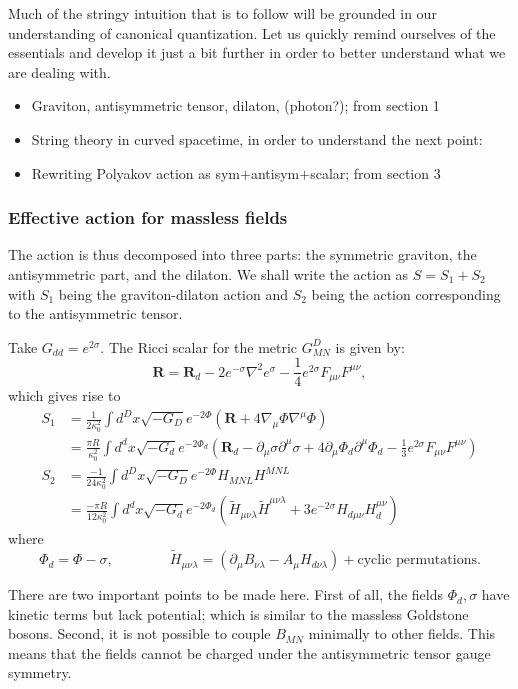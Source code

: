 \documentclass{report}
\theoremstyle{plain}
\theoremstyle{definition}
\theoremstyle{remark}
\newcommand{\FR}[2]{\frac{#1}{#2}}
\newcommand{\lam}{\lambda}
\newcommand{\sg}{\sigma}
\newcommand{\di}{\partial}
\newcommand{\colf}[1]{ {\color{Fuchsia} #1 } }
\begin{document}
Much of the stringy intuition that is to follow will be grounded in our
understanding of canonical quantization. Let us quickly remind ourselves of
the essentials and develop it just a bit further in order to better
understand what we are dealing with.

\begin{itemize}
\item Graviton, antisymmetric tensor, dilaton, (photon?); from section 1
\item String theory in curved spacetime, in order to understand the next
    point:
\item Rewriting Polyakov action as sym$+$antisym$+$scalar; from section 3
\end{itemize}

\begin{mdframed}
\subsubsection{Effective action for massless fields}
The action is thus decomposed into three parts: the symmetric graviton, the
antisymmetric part, and the dilaton. We shall write the action as $S =
S_1+S_2$ with $S_1$ being the graviton-dilaton action and $S_2$ being the
action corresponding to the antisymmetric tensor.

Take $G_{dd}=e^{2\sg}$. The Ricci scalar for the metric $G^D_{MN}$ is given
by: \[ \bm R = \bm R_d - 2e^{-\sg}\nabla^2e^\sg - \FR{1}{4}e^{2\sg}
F_{\mu\nu} F^{\mu\nu},\]
which gives rise to
\begin{align*}
    S_1 &= \FR{1}{2\kappa_0^2}\int d^Dx \sqrt{-G_D} e^{-2\Phi}(\bm
    R+4\nabla_\mu\Phi \nabla^\mu\Phi)\\
    &= \FR{\pi R}{\kappa_0^2}\int d^dx \sqrt{-G_d} e^{-2\Phi_d} \left( \bm
    R_d - \di_\mu\sg\di^\mu\sg+4\di_\mu\Phi_d\di^\mu\Phi_d -
    \FR{1}{3}e^{2\sg}F_{\mu\nu} F^{\mu\nu}
    \right)\\
S_2 &= \FR{-1}{24\kappa_0^2} \int d^D x\sqrt{-G_D} e^{-2\Phi}H_{MNL}H^{MNL}\\
&= \FR{-\pi R}{12\kappa_0^2} \int d^d x\sqrt{-G_d} e^{-2\Phi_d} \left( 
\tilde H_{\mu\nu\lam}\tilde H^{\mu\nu\lam} +
3e^{-2\sg}H_{d\mu\nu}H_d^{\mu\nu} \right)
\end{align*}
where \[\Phi_d = \Phi-\sg,\qquad\qquad
    \tilde H_{\mu\nu\lam}=(\di_\mu B_{\nu\lam}-A_\mu H_{d\nu\lam}) +
\text{cyclic permutations}.\]

There are two important points to be made here.  
First of all, the fields $\Phi_d,\sg$ have kinetic terms but lack
potential; which is similar to the massless Goldstone bosons. 
\colf{ Second, it is not possible to couple $B_{MN}$ minimally to other
fields.  This means that the fields cannot be charged under the
antisymmetric tensor gauge symmetry.}
\end{mdframed}
\end{document}
